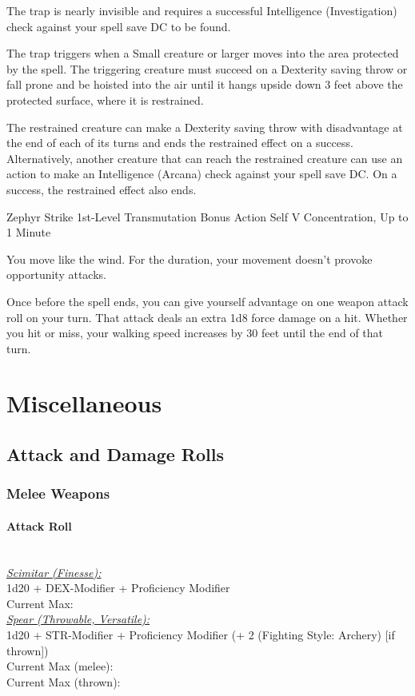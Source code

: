 \documentclass[letterpaper,openany,oneside,twocolumn]{book}
\begin{document}
The trap is nearly invisible and requires a successful Intelligence (Investigation) check against your spell save DC to be found.

The trap triggers when a Small creature or larger moves into the area protected by the spell. The triggering creature must succeed on a Dexterity saving throw or fall prone and be hoisted into the air until it hangs upside down 3 feet above the protected surface, where it is restrained.

The restrained creature can make a Dexterity saving throw with disadvantage at the end of each of its turns and ends the restrained effect on a success. Alternatively, another creature that can reach the restrained creature can use an action to make an Intelligence (Arcana) check against your spell save DC. On a success, the restrained effect also ends.

\DndSpellHeader
  {Zephyr Strike}
  {1st-Level Transmutation}
  {Bonus Action}
  {Self}
  {V}
  {Concentration, Up to 1 Minute}

You move like the wind. For the duration, your movement doesn't provoke opportunity attacks.

Once before the spell ends, you can give yourself advantage on one weapon attack roll on your turn. That attack deals an extra 1d8 force damage on a hit. Whether you hit or miss, your walking speed increases by 30 feet until the end of that turn.

\vfill\eject
\section*{Miscellaneous}
\subsection*{Attack and Damage Rolls}
\subsubsection*{Melee Weapons}
\paragraph*{Attack Roll}\hfill\\
\underline{\textit{Scimitar (Finesse):}}\\
1d20 + DEX-Modifier + Proficiency Modifier\\
\indent Current Max: 
\\
\underline{\textit{Spear (Throwable, Versatile):}}\\
1d20 + STR-Modifier + Proficiency Modifier (+ 2 (Fighting Style: Archery) [if thrown])\\
\indent Current Max (melee): \\
\indent Current Max (thrown): 
\end{document}
